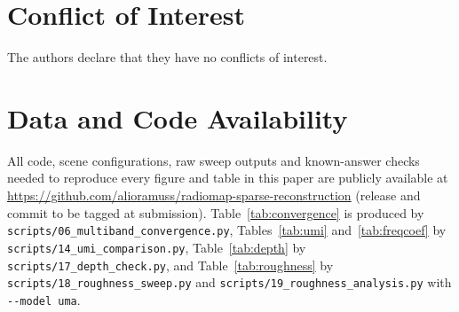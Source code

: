 \documentclass[conference]{IEEEtran}
\begin{document}
\section*{Conflict of Interest}
The authors declare that they have no conflicts of interest.

\section*{Data and Code Availability}
All code, scene configurations, raw sweep outputs and known-answer checks
needed to reproduce every figure and table in this paper are publicly
available at
\url{https://github.com/alioramuss/radiomap-sparse-reconstruction}
(release and commit to be tagged at submission). Table~\ref{tab:convergence}
is produced by \texttt{scripts/06\_\hspace{0pt}multiband\_\hspace{0pt}convergence.py},
Tables~\ref{tab:umi} and~\ref{tab:freqcoef} by
\texttt{scripts/14\_\hspace{0pt}umi\_\hspace{0pt}comparison.py},
Table~\ref{tab:depth} by \texttt{scripts/17\_\hspace{0pt}depth\_\hspace{0pt}check.py},
and Table~\ref{tab:roughness} by
\texttt{scripts/18\_\hspace{0pt}roughness\_\hspace{0pt}sweep.py} and
\texttt{scripts/19\_\hspace{0pt}roughness\_\hspace{0pt}analysis.py} with
\texttt{-{}-model uma}.



\end{document}
